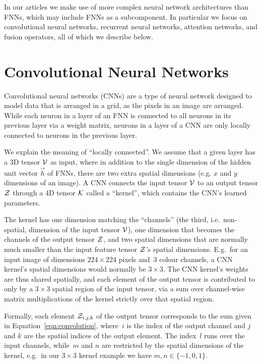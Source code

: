 In our articles we make use of more complex neural network architectures than
FNNs, which may include FNNs as a subcomponent.
In particular we focus on convolutional neural networks, recurrent neural
networks, attention networks, and fusion operators, all of which we describe
below.


\section{Convolutional Neural Networks}

Convolutional neural networks (CNNs) are a type of neural network designed to
model data that is arranged in a grid, as the pixels in an image are arranged.
While each neuron in a layer of an FNN is connected to all neurons in its
previous layer via a weight matrix, neurons in a layer of a CNN are only
locally connected to neurons in the previous layer.

We explain the meaning of ``locally connected''. We assume that a given layer
has a 3D tensor $\mathcal{V}$ as input, where in addition to the single dimension
of the hidden unit vector $\vec{h}$ of FNNs, there are two extra spatial
dimensions (e.g. $x$ and $y$ dimensions of an image).  A CNN connects the input
tensor $\mathcal{V}$ to an output tensor $\mathcal{Z}$ through a 4D tensor
$\mathcal{K}$ called a ``kernel'', which contains the CNN's learned parameters.

The kernel has one dimension matching the ``channels'' (the third, i.e.\
non-spatial, dimension of the input tensor $\mathcal{V}$), one dimension that
becomes the channels of the output tensor $\mathcal{Z}$, and two spatial
dimensions that are normally much smaller than the input feature tensor
$\mathcal{Z}$'s spatial dimensions. E.g.\ for an input image of dimensions $224
\times 224$ pixels and~\num{3} colour channels, a CNN kernel's spatial
dimensions would normally be $3 \times 3$. The CNN kernel's weights are thus
shared spatially, and each element of the output tensor is contributed to only
by a $3 \times 3$ spatial region of the input tensor, via a sum over
channel-wise matrix multiplications of the kernel strictly over that spatial
region.

Formally, each element $\mathcal{Z}_{i, j, k}$ of the output tensor corresponds to the
sum given in Equation~\ref{eqn:convolution}, where~$i$ is the index of the
output channel and $j$ and $k$ are the spatial indices of the output element.
The index~$l$ runs over the input channels, while~$m$ and $n$ are restricted by
the spatial dimensions of the kernel, e.g.\ in our $3 \times 3$ kernel example
we have $m, n \in \{-1, 0, 1\}$.

